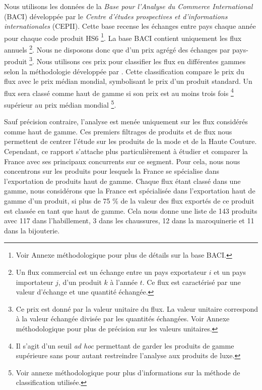 \documentclass[french,10pt,a4paper]{article}
\begin{document}
Nous utilisons les données de la \textit{Base pour l'Analyse du Commerce International} (BACI) \citep{Gaulier2010} développée par le \textit{Centre d'études prospectives et d'informations internationales} (CEPII). Cette base recense les échanges entre pays chaque année pour chaque code produit HS6 \footnote{Voir Annexe méthodologique pour plus de détails sur la base BACI.}. La base BACI contient uniquement les flux annuels \footnote{Un flux commercial est un échange entre un pays exportateur $i$ et un pays importateur $j$, d'un produit $k$ à l'année $t$. Ce flux est caractérisé par une valeur d'échange et une quantité échangée.}. Nous ne disposons donc que d'un \og prix\fg{} agrégé des échanges par pays-produit \footnote{Ce \og prix\fg{} est donné par la valeur unitaire du flux. La valeur unitaire correspond à la valeur échangée divisée par les quantités échangées. Voir Annexe méthodologique pour plus de précision sur les valeurs unitaires.}. Nous utilisons ces prix pour classifier les flux en différentes gammes selon la méthodologie développée par \cite{Fontagne1997}. Cette classification compare le prix du flux avec le prix médian mondial, symbolisant le prix d'un produit standard. Un flux sera classé comme haut de gamme si son prix est au moins trois fois \footnote{Il s'agit d'un seuil \textit{ad hoc} permettant de garder les produits de gamme supérieure sans pour autant restreindre l'analyse aux produits de luxe.} supérieur au prix médian mondial \footnote{Voir annexe méthodologique pour plus d'informations sur la méthode de classification utilisée.}.

\bigskip

Sauf précision contraire, l'analyse est menée uniquement sur les flux considérés comme haut de gamme. Ces premiers filtrages de produits et de flux nous permettent de centrer l'étude sur les produits de la mode et de la Haute Couture. Cependant, ce rapport s'attache plus particulièrement à étudier et comparer la France avec ses principaux concurrents sur ce segment. Pour cela, nous nous concentrons sur les produits pour lesquels la France se spécialise dans l'exportation de produits haut de gamme. Chaque flux étant classé dans une gamme, nous considérons que la France est spécialisée dans l'exportation haut de gamme d'un produit, si plus de 75 \% de la valeur des flux exportés de ce produit est classée en tant que haut de gamme. Cela nous donne une liste de 143 produits avec 117 dans l'habillement, 3 dans les chaussures, 12 dans la maroquinerie et 11 dans la bijouterie.
\end{document}
